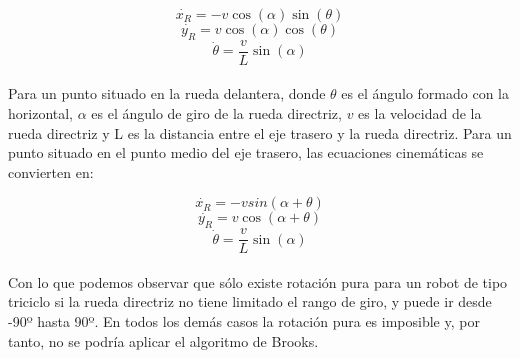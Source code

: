 \[ \dot{x_R} = - v \cos{(\alpha)} \sin{(\theta)} \]
\[ \dot{y_R} =   v \cos{(\alpha)} \cos{(\theta)} \]
\[ \dot{\theta} = \frac{v}{L} \sin{(\alpha)} \]\\

Para un punto situado en la rueda delantera, donde $\theta$ es el ángulo formado con la horizontal, $\alpha$ es el ángulo de giro de la rueda directriz, $v$ es la velocidad de la rueda directriz y L es la distancia entre el eje trasero y la rueda directriz. Para un punto situado en el punto medio del eje trasero, las ecuaciones cinemáticas se convierten en:

\[ \dot{x_R} = - v sin{(\alpha + \theta)} \]
\[ \dot{y_R} =   v \cos{(\alpha + \theta)} \]
\[ \dot{\theta} = \frac{v}{L} \sin{(\alpha)} \]\\

Con lo que podemos observar que sólo existe rotación pura para un robot de tipo triciclo si la rueda directriz no tiene limitado el rango de giro, y puede ir desde -90º hasta 90º. En todos los demás casos la rotación pura es imposible y, por tanto, no se podría aplicar el algoritmo de Brooks.


\newpage

